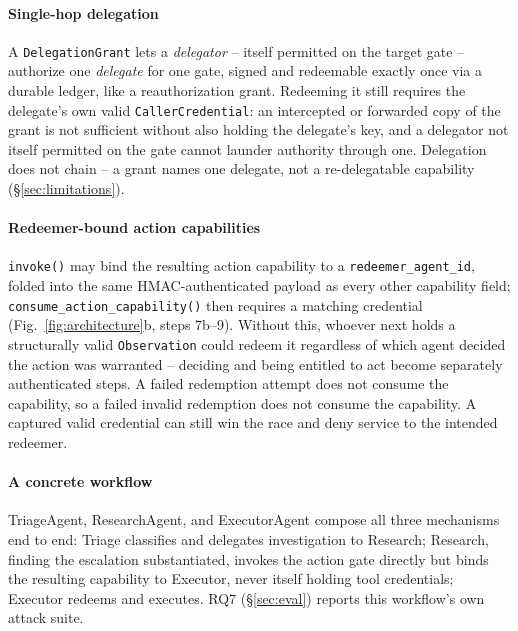 \documentclass[conference,compsoc]{IEEEtran}
\begin{document}
\paragraph{Single-hop delegation} A \texttt{DelegationGrant} lets a
\emph{delegator} -- itself permitted on the target gate -- authorize one
\emph{delegate} for one gate, signed and redeemable exactly once via a
durable ledger, like a reauthorization grant. Redeeming it still requires
the delegate's own valid \texttt{CallerCredential}: an intercepted or
forwarded copy of the grant is not sufficient without also holding the
delegate's key, and a delegator not itself permitted on the gate cannot
launder authority through one. Delegation does not chain -- a grant
names one delegate, not a re-delegatable capability
(\S\ref{sec:limitations}).

\paragraph{Redeemer-bound action capabilities} \texttt{invoke()} may bind
the resulting action capability to a \texttt{redeemer\_agent\_id}, folded
into the same HMAC-authenticated payload as every other capability field;
\texttt{consume\_action\_capability()} then requires a matching credential
(Fig.~\ref{fig:architecture}b, steps 7b--9). Without this, whoever
next holds a structurally valid \texttt{Observation} could redeem it
regardless of which agent decided the action was warranted -- deciding
and being entitled to act become separately authenticated steps. A
failed redemption attempt does not consume the capability, so
a failed invalid redemption does not consume the capability. A captured valid
credential can still win the race and deny service to the intended redeemer.

\paragraph{A concrete workflow} TriageAgent, ResearchAgent, and
ExecutorAgent compose all three mechanisms end to end: Triage classifies
and delegates investigation to Research; Research, finding the escalation
substantiated, invokes the action gate directly but binds the resulting
capability to Executor, never itself holding tool credentials; Executor
redeems and executes. RQ7 (\S\ref{sec:eval}) reports this workflow's own
attack suite.
\end{document}
